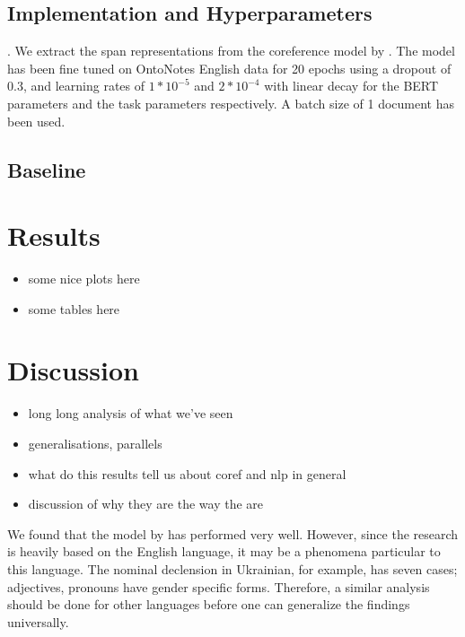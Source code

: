 \documentclass[11pt]{article}
\begin{document}
\subsection{Implementation and Hyperparameters}. We extract the span representations from the coreference model by \textcite{joshi2019coref}. The model has been fine tuned on OntoNotes English data for 20 epochs using a dropout of 0.3, and learning rates of $1 * 10 ^{-5}$ and $2 * 10 ^{-4} $ with linear decay for the BERT parameters and the task parameters respectively. A batch size of 1 document has been used. 


\subsection{Baseline}




\section{Results}

\begin{itemize}
\item some nice plots here
\item some tables here
\end{itemize}

\section{Discussion}

\begin{itemize}
\item long long analysis of what we've seen
\item generalisations, parallels
\item what do this results tell us about coref and nlp in general
\item discussion of why they are the way the are
\end{itemize}

We found that the model by \textcite{joshi2019coref} has performed very well. 
However, since the research is heavily based on the English language, it may be a phenomena particular to this language. The nominal declension in Ukrainian, for example, has seven cases; adjectives, pronouns have gender specific forms. Therefore, a similar analysis should be done for other languages before one can generalize the findings universally. %
\end{document}
